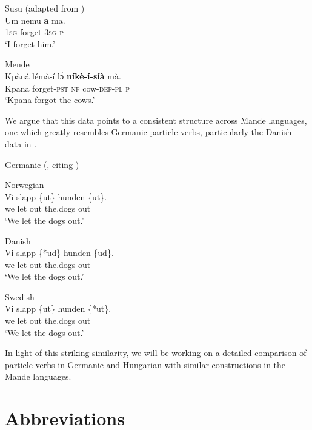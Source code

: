 \documentclass[output=paper,colorlinks,citecolor=brown,draftmode
]{langscibook}
\begin{document}
\ea \label{ex:Susu}
Susu (adapted from \citealt{duport1865outlines}) \\
\gll Um nemu \textbf{a} ma.	  \\
\textsc{1sg} forget \textsc{3sg} \textsc{p}  \\
\glt `I forget him.'
\z

\ea \label{ex:Mende: Final}
Mende \\
\gll Kpàná lémà-í lɔ́ \textbf{níkè-í-síà} mà. \\
Kpana forget-\textsc{pst} \textsc{nf} cow-\textsc{def}-\textsc{pl} \textsc{p} \\
\glt `Kpana forgot the cows.'
\z

We argue that this data points to a consistent structure across Mande languages, one which greatly resembles Germanic particle verbs, particularly the Danish data in . 


\ea \label{ex:Germanic}
Germanic (\citealt{larsen2014particles}, citing \citealt{svenonius1996verb})
\begin{xlist}

\ex \label{ex:Norwegian}
Norwegian \\
\gll Vi slapp \{ut\} hunden \{ut\}. \\
we let out the.dogs out \\
\glt `We let the dogs out.'

\begin{samepage}
    

\ex \label{ex:Danish}
Danish \\
\gll Vi slapp \{*ud\} hunden \{ud\}. \\
we let out the.dogs out \\
\glt `We let the dogs out.'
\end{samepage}

\ex \label{ex:Swedish}
Swedish \\
\gll Vi slapp \{ut\} hunden \{*ut\}. \\
we let out the.dogs out \\
\glt `We let the dogs out.'

\end{xlist}
\z 

In light of this striking similarity, we will be working on a detailed comparison of particle verbs in Germanic and Hungarian with similar constructions in the Mande languages.

\section*{Abbreviations}
\end{document}
